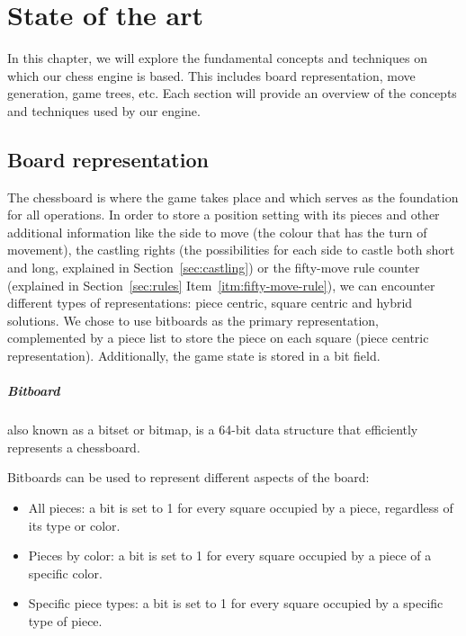 \chapter{State of the art}
\label{cap:estadoDeLaCuestion}

In this chapter, we will explore the fundamental concepts and techniques on which our chess engine is based. This includes board representation, move generation, game trees, etc. Each section will provide an overview of the concepts and techniques used by our engine.

\section{Board representation}
\label{sec:board}

The chessboard is where the game takes place and which serves as the foundation for all operations. In order to store a position setting with its pieces and other additional information like the side to move (the colour that has the turn of movement), the castling rights (the possibilities for each side to castle both short and long, explained in Section~\ref{sec:castling}) or the fifty-move rule counter (explained in Section~\ref{sec:rules} Item~\ref{itm:fifty-move-rule}), we can encounter different types of representations: piece centric, square centric and hybrid solutions. We chose to use bitboards as the primary representation, complemented by a piece list to store the piece on each square (piece centric representation). Additionally, the game state is stored in a bit field.

\paragraph{Bitboard} also known as a bitset or bitmap, is a 64-bit data structure that efficiently represents a chessboard.

\vspace{1em}

\noindent Bitboards can be used to represent different aspects of the board:

\begin{itemize}
    \item All pieces: a bit is set to 1 for every square occupied by a piece, regardless of its type or color.
    \item Pieces by color: a bit is set to 1 for every square occupied by a piece of a specific color. 
    \item Specific piece types: a bit is set to 1 for every square occupied by a specific type of piece.
\end{itemize}


